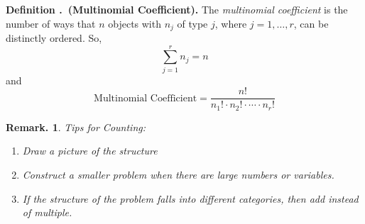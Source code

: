\documentclass[12pt, a4paper]{article}
\newcounter{index}[subsection]
\newenvironment*{df}[1]{\par\noindent\textbf{Definition \thesubsection.\stepcounter{index}\theindex\ (#1).}}{\par}
\newtheorem*{rmk}{Remark.}
\begin{document}
\begin{df}{Multinomial Coefficient}
	The \textit{multinomial coefficient} is the number of ways that $n$ objects with $n_j$ of type $j$, where $j=1,\dots,r$, can be distinctly ordered. So, \[\sum_{j=1}^rn_j=n\] and \[\text{Multinomial Coefficient}=\dfrac{n!}{n_1!\cdot n_2!\cdot\cdots\cdot n_r!}\]
\end{df}
\begin{rmk}
	Tips for Counting:
	\begin{enumerate}
		\item Draw a picture of the structure
		\item Construct a smaller problem when there are large numbers or variables.
		\item If the structure of the problem falls into different categories, then add instead of multiple. 
	\end{enumerate}	
\end{rmk}
\end{document}
